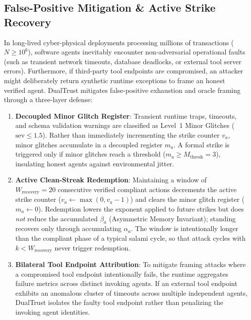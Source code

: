 \documentclass[journal]{IEEEtran}
\begin{document}
\subsection{False-Positive Mitigation \& Active Strike Recovery}
\label{sec:strike_recovery}
In long-lived cyber-physical deployments processing millions of transactions ($N \ge 10^6$), software agents inevitably encounter non-adversarial operational faults (such as transient network timeouts, database deadlocks, or external tool server errors). Furthermore, if third-party tool endpoints are compromised, an attacker might deliberately return synthetic runtime exceptions to frame an honest verified agent. DualTrust mitigates false-positive exhaustion and oracle framing through a three-layer defense:
\begin{enumerate}[leftmargin=12pt, topsep=2pt, itemsep=1pt]
\item \textbf{Decoupled Minor Glitch Register}: Transient runtime traps, timeouts, and schema validation warnings are classified as Level~1 Minor Glitches ($\text{sev} \le 1.5$). Rather than immediately incrementing the strike counter $v_a$, minor glitches accumulate in a decoupled register $m_a$. A formal strike is triggered only if minor glitches reach a threshold ($m_a \ge M_{\text{thresh}} = 3$), insulating honest agents against environmental jitter.
\item \textbf{Active Clean-Streak Redemption}: Maintaining a window of $W_{\text{recovery}} = 20$ consecutive verified compliant actions decrements the active strike counter ($v_a \leftarrow \max(0, v_a - 1)$) and clears the minor glitch register ($m_a \leftarrow 0$). Redemption lowers the exponent applied to future strikes but does \emph{not} reduce the accumulated $\beta_a$ (Asymmetric Memory Invariant); standing recovers only through accumulating $\alpha_a$. The window is intentionally longer than the compliant phase of a typical salami cycle, so that attack cycles with $k < W_{\text{recovery}}$ never trigger redemption.
\item \textbf{Bilateral Tool Endpoint Attribution}: To mitigate framing attacks where a compromised tool endpoint intentionally fails, the runtime aggregates failure metrics across distinct invoking agents. If an external tool endpoint exhibits an anomalous cluster of timeouts across multiple independent agents, DualTrust isolates the faulty tool endpoint rather than penalizing the invoking agent identities.
\end{enumerate}
\end{document}
